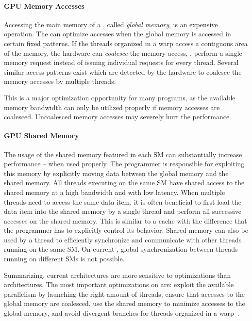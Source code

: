\paragraph{GPU Memory Accesses}
Accessing the main memory of a \GPU, called \emph{global memory}, is an expensive operation.
The \GPU can optimize accesses when the global memory is accessed in certain fixed patterns.
If the threads organized in a warp access a contiguous area of the memory, the hardware can \emph{coalesce} the memory access, \ie, perform a single memory request instead of issuing individual requests for every thread.
Several similar access patterns exist which are detected by the hardware to coalesce the memory accesses by multiple threads.

This is a major optimization opportunity for many \GPU programs, as the available memory bandwidth can only be utilized properly if memory accesses are coalesced.
Uncoalesced memory accesses may severely hurt the performance.


\paragraph{GPU Shared Memory}
The usage of the shared memory featured in each SM can substantially increase performance -- when used properly.
The programmer is responsible for exploiting this memory by explicitly moving data between the global memory and the shared memory.
All threads executing on the same SM have shared access to the shared memory at a high bandwidth and with low latency.
When multiple threads need to access the same data item, it is often beneficial to first load the data item into the shared memory by a single thread and perform all successive accesses on the shared memory.
This is similar to a cache with the difference that the programmer has to explicitly control its behavior.
Shared memory can also be used by a thread to efficiently synchronize and communicate with other threads running on the same SM.
On current \GPUs, global synchronization between threads running on different SMs is not possible.

\bigskip
Summarizing, current \GPU architectures are more sensitive to optimizations than \CPU architectures.
The most important optimizations on \GPUs are:
exploit the available parallelism by launching the right amount of threads, ensure that accesses to the global memory are coalesced, use the shared memory to minimize accesses to the global memory, and avoid divergent branches for threads organized in a warp~\cite{CUDATuningKepler2015}.

